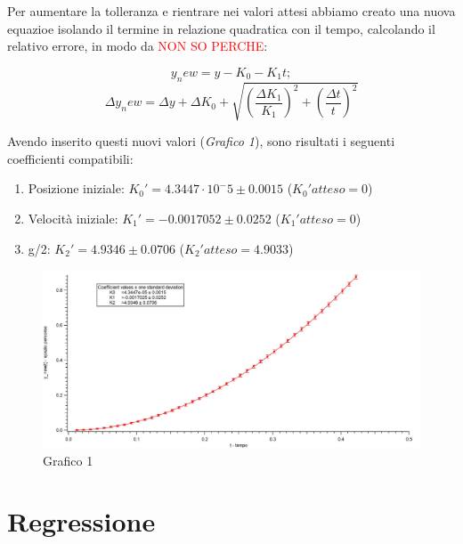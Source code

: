 \documentclass[12pt, a4paper]{article}
\begin{document}
\bigskip

Per aumentare la tolleranza e rientrare nei valori attesi abbiamo creato una nuova equazioe isolando il termine in relazione  quadratica con il tempo, calcolando il relativo errore, in modo da \textcolor{red}{NON SO PERCHE}: 

\begin{equation}
    y_new = y - K_0 - K_1t ;  
\end{equation}
\begin{equation}
 \Delta y_new = \Delta y + \Delta K_0 + \sqrt{(\frac{\Delta K_1}{K_1})^2 + (\frac{\Delta t}{t})^2}
 \end{equation}


 \bigskip


Avendo inserito questi nuovi valori (\textit{Grafico 1}), sono risultati i seguenti coefficienti compatibili:
\renewcommand{\theenumii}{\roman{enumii}}
    \begin{enumerate}
    \itemsep0em 
        \item Posizione iniziale: $K_0' =  4.3447 \cdot 10^-5 \pm 0.0015$ ($K_0'atteso = 0$)
        \item Velocità iniziale:  $K_1' =  -0.0017052 \pm 0.0252$ ($K_1'atteso = 0$)
        \item g/2:                $K_2' =  4.9346 \pm 0.0706$ ($K_2'atteso = 4.9033$)
    \end{enumerate}

\begin{figure}
\centering
\includegraphics[width=150mm]{graph1.jpg}
\caption{Grafico 1}
\end{figure}


\section{Regressione}
\end{document}
